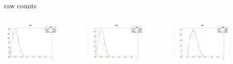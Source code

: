 \begin{frame}{raw counts}
\begin{columns}
\begin{column}[T]{0.25\textwidth}
\includegraphics[width = 0.7\textwidth]{results/yield/statistics/yield_x_Q2_z_0.50_3.979_0.40_pos.png}
\end{column}
\begin{column}[T]{0.25\textwidth}
\includegraphics[width = 0.7\textwidth]{results/yield/statistics/yield_x_Q2_z_0.50_3.979_0.40_neg.png}
\end{column}
\begin{column}[T]{0.25\textwidth}
\includegraphics[width = 0.7\textwidth]{results/yield/statistics/yield_x_Q2_z_0.50_3.979_0.50_pos.png}

\end{column}
\end{columns}
\end{frame}
